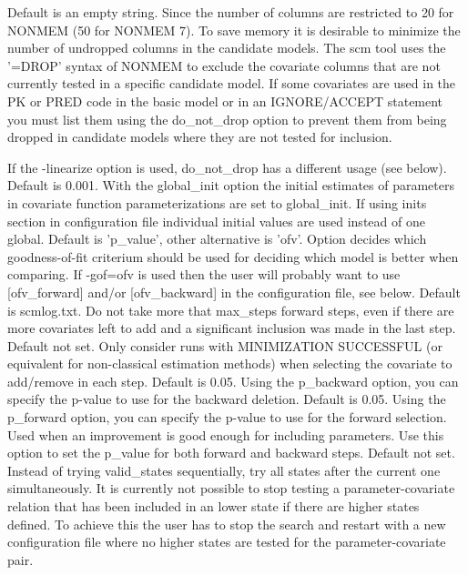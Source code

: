 \begin{optionlist}
Default is an empty string. Since the number of columns are restricted to 20 for NONMEM (50 for NONMEM 7). To save memory it is desirable to minimize the number of undropped columns in the candidate models. The scm tool uses the '=DROP' syntax of NONMEM to exclude the covariate columns that are not currently tested in a specific candidate model. If some covariates are 
used in the PK or PRED code in the basic model or in an IGNORE/ACCEPT statement you must list them using the do\_not\_drop option to prevent them from being dropped in candidate models where they are not tested for inclusion. 

If the -linearize option is used, do\_not\_drop has a different usage (see below). 
\nextopt
{}
Default is 0.001. With the global\_init option the initial estimates of parameters in covariate function parameterizations are set to global\_init. If using inits section in configuration file individual initial values are used instead of one global. 
\nextopt
{}
Default is 'p\_value', other alternative is 'ofv'. Option decides which goodness-of-fit criterium should be used for deciding which model is better when comparing. 	If -gof=ofv is used then the user will probably want to use [ofv\_forward] and/or [ofv\_backward] in the configuration file, see below.
\nextopt
{}
Default is scmlog.txt.
\nextopt
{}
Do not take more that max\_steps forward steps, even if there are more covariates left to add and a significant inclusion was made in the last step. 
\nextopt
{}
Default not set. Only consider runs with MINIMIZATION SUCCESSFUL (or equivalent for non-classical estimation methods) when selecting the covariate to add/remove in each step. 
\nextopt
{}
Default is 0.05. Using the p\_backward option, you can specify the p-value to use for the backward deletion. 
\nextopt	
{}
Default is 0.05. Using the p\_forward option, you can specify the p-value to use for the forward selection. Used when an improvement is good enough for including parameters. 
\nextopt
{}
Use this option to set the p\_value for both forward and backward steps. 
\nextopt
{}
Default not set. Instead of trying valid\_states sequentially, try all states after the current one simultaneously. It is currently not possible to stop testing a parameter-covariate relation that has been included in an lower state if there are higher states defined. To achieve this the user has to stop the search and restart with a new configuration file where no higher states are tested for the parameter-covariate pair. 
\nextopt
\end{optionlist}

